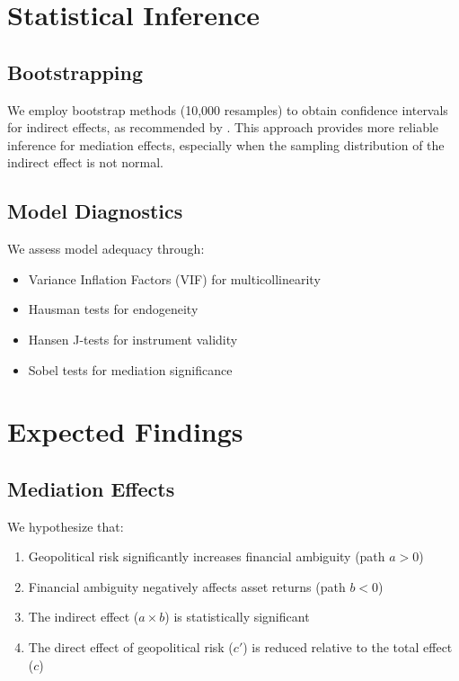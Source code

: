 \documentclass{article}
\begin{document}
\section{Statistical Inference}

\subsection{Bootstrapping}

We employ bootstrap methods (10,000 resamples) to obtain confidence intervals for indirect effects, as recommended by \citet{preacher2008asymptotic}. This approach provides more reliable inference for mediation effects, especially when the sampling distribution of the indirect effect is not normal.

\subsection{Model Diagnostics}

We assess model adequacy through:
\begin{itemize}
\item Variance Inflation Factors (VIF) for multicollinearity
\item Hausman tests for endogeneity
\item Hansen J-tests for instrument validity
\item Sobel tests for mediation significance
\end{itemize}

\section{Expected Findings}

\subsection{Mediation Effects}
We hypothesize that:
\begin{enumerate}
\item Geopolitical risk significantly increases financial ambiguity (path $a > 0$)
\item Financial ambiguity negatively affects asset returns (path $b < 0$)
\item The indirect effect ($a \times b$) is statistically significant
\item The direct effect of geopolitical risk ($c'$) is reduced relative to the total effect ($c$)
\end{enumerate}
\end{document}
